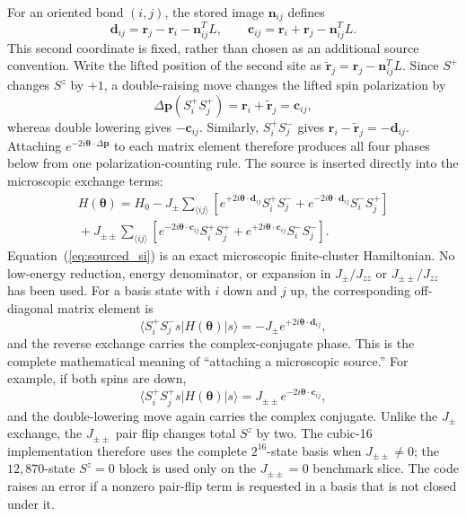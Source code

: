 \documentclass[aps,prl,onecolumn,amsmath,amssymb]{revtex4-2}
\newcommand{\Jzz}{J_{zz}}
\newcommand{\Jpm}{J_{\pm}}
\newcommand{\Jpp}{J_{\pm\pm}}
\newcommand{\btheta}{\bm\theta}
\begin{document}
For an oriented bond $(i,j)$, the stored image $\bm n_{ij}$ defines
\begin{equation}
 \bm d_{ij}=\bm r_j-\bm r_i-\bm n_{ij}^{T}L,
 \qquad
 \bm c_{ij}=\bm r_i+\bm r_j-\bm n_{ij}^{T}L.
\end{equation}
This second coordinate is fixed, rather than chosen as an additional source
convention.  Write the lifted position of the second site as
$\widetilde{\bm r}_j=\bm r_j-\bm n_{ij}^{T}L$.  Since $S^+$ changes $S^z$
by $+1$, a double-raising move changes the lifted spin polarization by
\begin{equation}
 \Delta\bm p(S_i^+S_j^+)=\bm r_i+\widetilde{\bm r}_j=\bm c_{ij},
\end{equation}
whereas double lowering gives $-\bm c_{ij}$.  Similarly,
$S_i^+S_j^-$ gives $\bm r_i-\widetilde{\bm r}_j=-\bm d_{ij}$.  Attaching
$e^{-2i\btheta\cdot\Delta\bm p}$ to each matrix element therefore produces
all four phases below from one polarization-counting rule.
The source is inserted directly into the microscopic exchange terms:
\begin{align}
 H(\btheta)=H_0-\Jpm\sum_{\langle ij\rangle}
 \left[e^{+2i\btheta\cdot\bm d_{ij}}S_i^+S_j^-
      +e^{-2i\btheta\cdot\bm d_{ij}}S_i^-S_j^+\right]\nonumber\\
 {}+\Jpp\sum_{\langle ij\rangle}
 \left[e^{-2i\btheta\cdot\bm c_{ij}}S_i^+S_j^+
      +e^{+2i\btheta\cdot\bm c_{ij}}S_i^-S_j^-\right].
\label{eq:sourced_si}
\end{align}
Equation~(\ref{eq:sourced_si}) is an exact microscopic finite-cluster
Hamiltonian.  No low-energy reduction, energy denominator, or expansion in
$\Jpm/\Jzz$ or $\Jpp/\Jzz$ has been used.
For a basis state with $i$ down and $j$ up, the corresponding off-diagonal
matrix element is
\begin{equation}
 \langle S_i^+S_j^-s|H(\btheta)|s\rangle
 =-\Jpm e^{+2i\btheta\cdot\bm d_{ij}},
\end{equation}
and the reverse exchange carries the complex-conjugate phase.  This is the
complete mathematical meaning of ``attaching a microscopic source.''  For
example, if both spins are down,
\begin{equation}
 \langle S_i^+S_j^+s|H(\btheta)|s\rangle
 =\Jpp e^{-2i\btheta\cdot\bm c_{ij}},
\end{equation}
and the double-lowering move again carries the complex conjugate.
Unlike the $\Jpm$ exchange, the $\Jpp$ pair flip changes total $S^z$ by two.
The cubic-16 implementation therefore uses the complete $2^{16}$-state basis
when $\Jpp\ne0$; the $12{,}870$-state $S^z=0$ block is used only on the
$\Jpp=0$ benchmark slice.  The code raises an error if a nonzero pair-flip
term is requested in a basis that is not closed under it.
\end{document}
